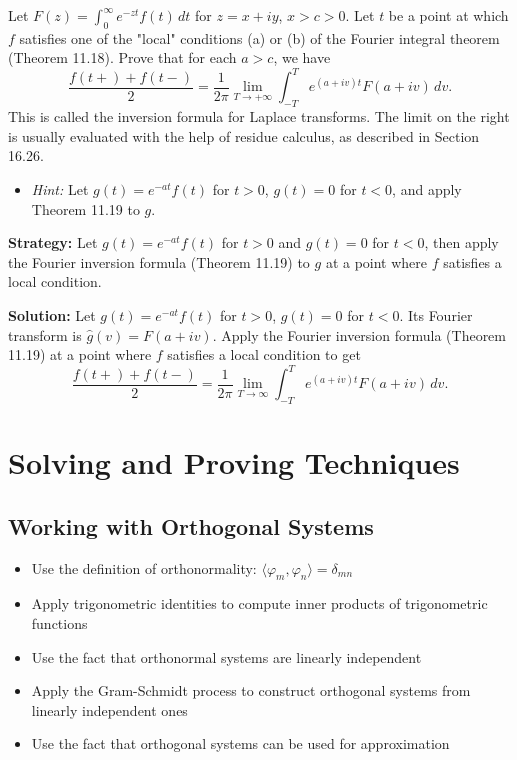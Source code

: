 \begin{problembox}
\begin{problemstatement}
Let $F(z) = \int_0^\infty e^{-zt} f(t) \, dt$ for $z = x + iy$, $x > c > 0$. Let $t$ be a point at which $f$ satisfies one of the "local" conditions (a) or (b) of the Fourier integral theorem (Theorem 11.18). Prove that for each $a > c$, we have
\[
\frac{f(t+) + f(t-)}{2} = \frac{1}{2\pi} \lim_{T \to +\infty} \int_{-T}^T e^{(a + iv)t} F(a + iv) \, dv.
\]
This is called the inversion formula for Laplace transforms. The limit on the right is usually evaluated with the help of residue calculus, as described in Section 16.26.
\begin{itemize}
\item \textit{Hint:} Let $g(t) = e^{-at} f(t)$ for $t > 0$, $g(t) = 0$ for $t < 0$, and apply Theorem 11.19 to $g$.
\end{itemize}
\end{problemstatement}
\end{problembox}

\noindent\textbf{Strategy:} Let $g(t)=e^{-at}f(t)$ for $t>0$ and $g(t)=0$ for $t<0$, then apply the Fourier inversion formula (Theorem 11.19) to $g$ at a point where $f$ satisfies a local condition.

\bigskip\noindent\textbf{Solution:}
Let $g(t)=e^{-at}f(t)$ for $t>0$, $g(t)=0$ for $t<0$. Its Fourier transform is $\widehat g(v)=F(a+iv)$. Apply the Fourier inversion formula (Theorem 11.19) at a point where $f$ satisfies a local condition to get
\[\frac{f(t+)+f(t-)}{2}=\frac{1}{2\pi}\lim_{T\to\infty}\int_{-T}^T e^{(a+iv)t}F(a+iv)\,dv.\]

\section{Solving and Proving Techniques}

\subsection*{Working with Orthogonal Systems}
\begin{itemize}
\item Use the definition of orthonormality: $\langle \varphi_m, \varphi_n \rangle = \delta_{mn}$
\item Apply trigonometric identities to compute inner products of trigonometric functions
\item Use the fact that orthonormal systems are linearly independent
\item Apply the Gram-Schmidt process to construct orthogonal systems from linearly independent ones
\item Use the fact that orthogonal systems can be used for approximation
\end{itemize}

